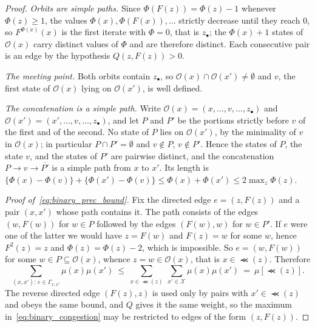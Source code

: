 \documentclass[aos]{imsart}%
\newcommand{\ambientspace}[0]{\mathcal{X}}
\theoremstyle{plain}
\theoremstyle{definition}
\begin{document}
    \begin{proof}
        \emph{Orbits are simple paths.} Since $\Phi(F(z))=\Phi(z)-1$ whenever
        $\Phi(z)\geq1$, the values $\Phi(x),\Phi(F(x)),\dots$ strictly decrease
        until they reach $0$, so $F^{\Phi(x)}(x)$ is the first iterate with
        $\Phi=0$, that is $z_\bullet$; the $\Phi(x)+1$ states of
        $\mathcal{O}(x)$ carry distinct values of $\Phi$ and are therefore
        distinct. Each consecutive pair is an edge by the hypothesis
        $Q(z,F(z))>0$.

        \emph{The meeting point.} Both orbits contain $z_\bullet$, so
        $\mathcal{O}(x)\cap\mathcal{O}(x')\neq\emptyset$ and $v$, the first
        state of $\mathcal{O}(x)$ lying on $\mathcal{O}(x')$, is well defined.

        \emph{The concatenation is a simple path.} Write
        $\mathcal{O}(x)=(x,\dots,v,\dots,z_\bullet)$ and
        $\mathcal{O}(x')=(x',\dots,v,\dots,z_\bullet)$, and let $P$ and $P'$
        be the portions strictly before $v$ of the first and of the second.
        No state of $P$ lies on $\mathcal{O}(x')$, by the minimality of $v$ in
        $\mathcal{O}(x)$; in particular $P\cap P'=\emptyset$ and $v\notin P$,
        $v\notin P'$. Hence the states of $P$, the state $v$, and the states of
        $P'$ are pairwise distinct, and the concatenation
        $P\to v\to\overline{P'}$ is a simple path from $x$ to $x'$. Its length
        is $\{\Phi(x)-\Phi(v)\}+\{\Phi(x')-\Phi(v)\}\leq\Phi(x)+\Phi(x')
        \leq2\max_z\Phi(z)$.

        \emph{Proof of~\eqref{eq:binary_prec_bound}.} Fix the directed edge
        $e=(z,F(z))$ and a pair $(x,x')$ whose path contains it. The path
        consists of the edges $(w,F(w))$ for $w\in P$ followed by the edges
        $(F(w),w)$ for $w\in P'$. If $e$ were one of the latter we would have
        $z=F(w)$ and $F(z)=w$ for some $w$, hence $F^{2}(z)=z$ and
        $\Phi(z)=\Phi(z)-2$, which is impossible. So $e=(w,F(w))$ for some
        $w\in P\subseteq\mathcal{O}(x)$, whence $z=w\in\mathcal{O}(x)$, that is
        $x\in\Prec(z)$. Therefore
        \begin{equation*}
            \sum_{(x,x'):\,e\in\Gamma_{x,x'}}\mu(x)\mu(x')
            \ \leq\ \sum_{x\in\Prec(z)}\ \sum_{x'\in\ambientspace}
            \mu(x)\mu(x')\ =\ \mu[\Prec(z)] .
        \end{equation*}
        The reverse directed edge $(F(z),z)$ is used only by pairs with
        $x'\in\Prec(z)$ and obeys the same bound, and $Q$ gives it the same
        weight, so the maximum in~\eqref{eq:binary_congestion} may be
        restricted to edges of the form $(z,F(z))$.
    \end{proof}
\end{document}
